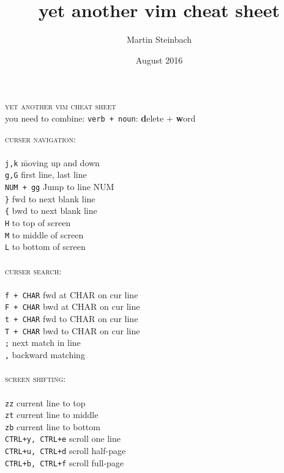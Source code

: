 \documentclass[a4paper,10pt]{scrartcl}
\title{yet another vim cheat sheet}
\author{Martin Steinbach}
\date{August 2016}
\begin{document}
\centering\textsc{\huge{yet another vim cheat sheet}}\\
\vspace{0.5cm}
\large{\centering you need to combine: \texttt{verb + noun}: \textbf{d}elete + \textbf{w}ord}

\begin{multicols}{2}
\begin{tabbing}
\large{\textsc{curser navigation:}}\\\\
\texttt{j,k}		\hspace{2.5 cm}\= moving up and down\\
\texttt{g,G}		\> first line, last line\\
\texttt{NUM + gg}		\> Jump to line NUM\\
\texttt{\}}			\> fwd to next blank line\\
\texttt{\{}			\> bwd to next blank line\\
\texttt{H}	\> to top of screen\\
\texttt{M}	\> to middle of screen\\
\texttt{L}	\> to bottom of screen\\\\

\large{\textsc{curser search:}}\\\\
\texttt{f + CHAR} 	\> fwd at CHAR on cur line\\
\texttt{F + CHAR} 	\> bwd at CHAR on cur line\\
\texttt{t + CHAR} 	\> fwd to CHAR on cur line\\
\texttt{T + CHAR} 	\> bwd to CHAR on cur line\\
\texttt{;} 	\> next match in line\\
\texttt{,} 	\> backward matching\\\\

\large{\textsc{screen shifting:}}\\\\
\texttt{zz}			\> current line to top\\
\texttt{zt}			\> current line to middle\\
\texttt{zb}			\> current line to bottom\\
\texttt{CTRL+y, CTRL+e}		\> scroll one line\\
\texttt{CTRL+u, CTRL+d}		\> scroll half-page\\
\texttt{CTRL+b, CTRL+f}		\> scroll full-page\\\\


\end{tabbing}
\end{multicols}
\end{document}
